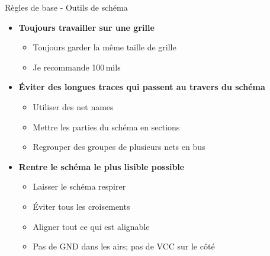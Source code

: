 \begin{frame}{Règles de base - Outils de schéma}
    \begin{itemize}
        \item \textbf{Toujours travailler sur une grille}
        \begin{itemize}
            \item Toujours garder la même taille de grille
            \item Je recommande 100\,mils
        \end{itemize}
        \bigskip
        \item \textbf{Éviter des longues traces qui passent au travers du schéma}
        \begin{itemize}
            \item Utiliser des net names
            \item Mettre les parties du schéma en sections
            \item Regrouper des groupes de plusieurs nets en bus
        \end{itemize}
        \bigskip
        \item \textbf{Rentre le schéma le plus lisible possible}
        \begin{itemize}
            \item Laisser le schéma respirer
            \item Éviter tous les croisements
            \item Aligner tout ce qui est alignable
            \item Pas de GND dans les airs; pas de VCC sur le côté
        \end{itemize}
    \end{itemize}
\end{frame}

